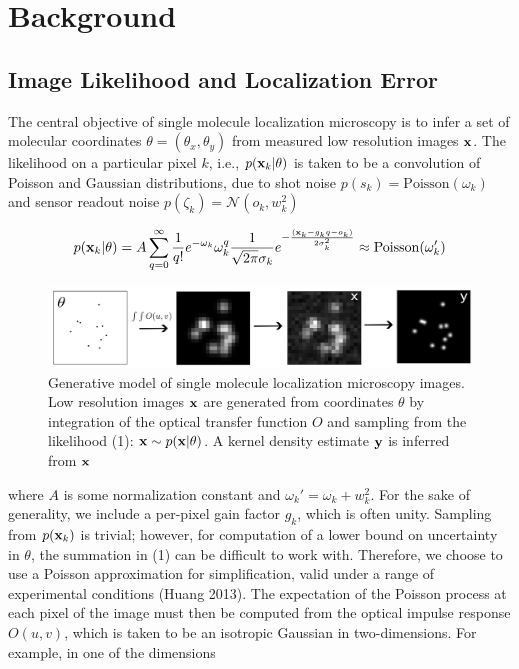 \documentclass{article}
\begin{document}
\section{Background}

\subsection{Image Likelihood and Localization Error}

The central objective of single molecule localization microscopy is to infer a set of molecular coordinates $\theta=(\theta_{x},\theta_{y})$ from measured low resolution images $\bold{x}$. The likelihood on a particular pixel $k$, i.e., $p(\bold{x}_k|\theta)$ is taken to be a convolution of Poisson and Gaussian distributions, due to shot noise $p(s_{k}) = \mathrm{Poisson}(\omega_{k})$ and sensor readout noise $p(\zeta_{k}) = \mathcal{N}(o_{k},w_{k}^{2})$ 

\begin{equation}
p(\bold{x}_{k}|\theta) = A\sum_{q=0}^{\infty} \frac{1}{q!}e^{-\omega_{k}}\omega_{k}^{q}\frac{1}{\sqrt{2\pi}\sigma_{k}}e^{-\frac{(\bold{x}_{k}-g_{k}q-o_{k})}{2\sigma_{k}^{2}}} \approx \mathrm{Poisson}(\omega_{k}')
\end{equation}


\begin{figure}
\includegraphics[scale=0.225]{Generation.png}
\caption{Generative model of single molecule localization microscopy images. Low resolution images $\bold{x}$ are generated from coordinates $\theta$ by integration of the optical transfer function $O$ and sampling from the likelihood (1): $\bold{x}\sim p(\bold{x}|\theta)$. A kernel density estimate $\bold{y}$ is inferred from $\bold{x}$}
\end{figure}

where $A$ is some normalization constant and $\omega_{k}' = \omega_{k} + w_{k}^{2}$. For the sake of generality, we include a per-pixel gain factor $g_{k}$, which is often unity. Sampling from $p(\bold{x}_{k})$ is trivial; however, for computation of a lower bound on uncertainty in $\theta$, the summation in (1) can be difficult to work with. Therefore, we choose to use a Poisson approximation for simplification, valid under a range of experimental conditions (Huang 2013). The expectation of the Poisson process at each pixel of the image must then be computed from the optical impulse response $O(u,v)$, which is taken to be an isotropic Gaussian in two-dimensions. For example, in one of the dimensions
\end{document}
